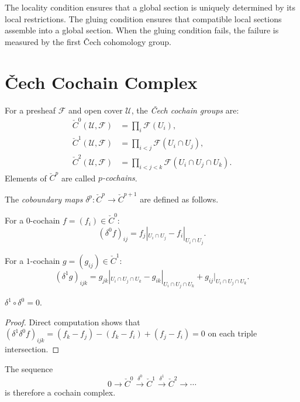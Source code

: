 \documentclass[11pt,openany]{book}
\begin{document}
The locality condition ensures that a global section is
uniquely determined by its local restrictions.  The gluing
condition ensures that compatible local sections assemble
into a global section.  When the gluing condition fails,
the failure is measured by the first Čech cohomology group.

\section{Čech Cochain Complex}
\label{sec:cochain-complex}

\begin{definition}
For a presheaf $\mathcal{F}$ and open cover $\mathcal{U}$,
the \emph{Čech cochain groups} are:
\begin{align*}
  \check{C}^0(\mathcal{U}, \mathcal{F})
    &= \prod_{i} \mathcal{F}(U_i), \\
  \check{C}^1(\mathcal{U}, \mathcal{F})
    &= \prod_{i < j} \mathcal{F}(U_i \cap U_j), \\
  \check{C}^2(\mathcal{U}, \mathcal{F})
    &= \prod_{i < j < k} \mathcal{F}(U_i \cap U_j \cap U_k).
\end{align*}
Elements of $\check{C}^p$ are called \emph{$p$-cochains}.
\end{definition}

\begin{definition}
The \emph{coboundary maps} $\delta^p : \check{C}^p \to
\check{C}^{p+1}$ are defined as follows.

For a $0$-cochain $f = (f_i) \in \check{C}^0$:
\[
  (\delta^0 f)_{ij} = f_j|_{U_i \cap U_j}
    - f_i|_{U_i \cap U_j}.
\]

For a $1$-cochain $g = (g_{ij}) \in \check{C}^1$:
\[
  (\delta^1 g)_{ijk} = g_{jk}|_{U_i \cap U_j \cap U_k}
    - g_{ik}|_{U_i \cap U_j \cap U_k}
    + g_{ij}|_{U_i \cap U_j \cap U_k}.
\]
\end{definition}

\begin{proposition}
\label{prop:cochain-complex}
$\delta^1 \circ \delta^0 = 0$.
\end{proposition}

\begin{proof}
Direct computation shows that $(\delta^1 \delta^0 f)_{ijk}
= (f_k - f_j) - (f_k - f_i) + (f_j - f_i) = 0$ on each
triple intersection.
\end{proof}

The sequence
\[
  0 \longrightarrow \check{C}^0 \xrightarrow{\delta^0}
  \check{C}^1 \xrightarrow{\delta^1} \check{C}^2
  \longrightarrow \cdots
\]
is therefore a cochain complex.
\end{document}
